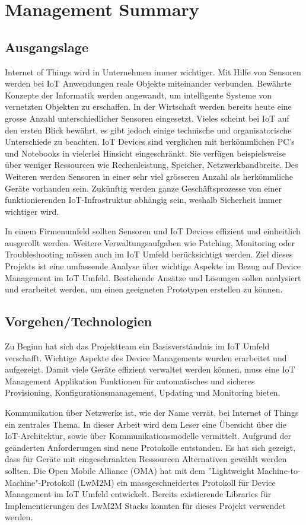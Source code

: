 \chapter*{Management Summary}
\section*{Ausgangslage}
Internet of Things wird in Unternehmen immer wichtiger. Mit Hilfe von Sensoren werden bei IoT Anwendungen reale Objekte miteinander verbunden. Bewährte Konzepte der Informatik werden angewandt, um intelligente Systeme von vernetzten Objekten zu erschaffen. In der Wirtschaft werden bereits heute eine grosse Anzahl unterschiedlicher Sensoren eingesetzt. Vieles scheint bei IoT auf den ersten Blick bewährt, es gibt jedoch einige technische und organisatorische Unterschiede zu beachten. IoT Devices sind verglichen mit herkömmlichen PC's und Notebooks in vielerlei Hinsicht eingeschränkt. Sie verfügen beispielsweise über weniger Ressourcen wie Rechenleistung, Speicher, Netzwerkbandbreite. Des Weiteren werden Sensoren in einer sehr viel grösseren Anzahl als herkömmliche Geräte vorhanden sein. Zukünftig werden ganze Geschäftsprozesse von einer funktionierenden IoT-Infrastruktur abhängig sein, weshalb Sicherheit immer wichtiger wird.

In einem Firmenumfeld sollten Sensoren und IoT Devices effizient und einheitlich ausgerollt werden. Weitere Verwaltungsaufgaben wie Patching, Monitoring oder Troubleshooting müssen auch im IoT Umfeld berücksichtigt werden. Ziel dieses Projekts ist eine umfassende Analyse über wichtige Aspekte im Bezug auf Device Management im IoT Umfeld. Bestehende Ansätze und Lösungen sollen analysiert und erarbeitet werden, um einen geeigneten Prototypen erstellen zu können. 
\section*{Vorgehen/Technologien}
Zu Beginn hat sich das Projektteam ein Basisverständnis im IoT Umfeld verschafft. Wichtige Aspekte des Device Managements wurden erarbeitet und aufgezeigt. Damit viele Geräte effizient verwaltet werden können, muss eine IoT Management Applikation Funktionen für automatisches und sicheres Provisioning, Konfigurationsmanagement, Updating und Monitoring bieten. 

Kommunikation über Netzwerke ist, wie der Name verrät, bei Internet of Things ein zentrales Thema. In dieser Arbeit wird dem Leser eine Übersicht über die IoT-Architektur, sowie über Kommunikationsmodelle vermittelt. Aufgrund der geänderten Anforderungen sind neue Protokolle entstanden. Es hat sich gezeigt, dass für Geräte mit eingeschränkten Ressourcen Alternativen gewählt werden sollten. Die Open Mobile Alliance (OMA) hat mit dem ''Lightweight Machine-to-Machine"-Protokoll (LwM2M) ein massgeschneidertes Protokoll für Device Management im IoT Umfeld entwickelt. Bereits existierende Libraries für Implementierungen des LwM2M Stacks konnten für dieses Projekt verwendet werden.

